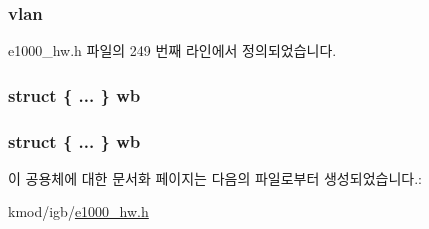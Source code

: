 \subsubsection[{\texorpdfstring{vlan}{vlan}}]{ vlan}\hypertarget{unione1000__rx__desc__extended_ae51e377f3b473a4541af0505e74399ae}{}\label{unione1000__rx__desc__extended_ae51e377f3b473a4541af0505e74399ae}


e1000\+\_\+hw.\+h 파일의 249 번째 라인에서 정의되었습니다.

\subsubsection[{\texorpdfstring{wb}{wb}}]{\setlength{\rightskip}{0pt plus 5cm}struct \{ ... \}   wb}\hypertarget{unione1000__rx__desc__extended_a18854ebc3616866f5bad02e274bd8818}{}\label{unione1000__rx__desc__extended_a18854ebc3616866f5bad02e274bd8818}
\subsubsection[{\texorpdfstring{wb}{wb}}]{\setlength{\rightskip}{0pt plus 5cm}struct \{ ... \}   wb}\hypertarget{unione1000__rx__desc__extended_af4c7cd19a677da5e7149240bc502f159}{}\label{unione1000__rx__desc__extended_af4c7cd19a677da5e7149240bc502f159}


이 공용체에 대한 문서화 페이지는 다음의 파일로부터 생성되었습니다.\+:\begin{DoxyCompactItemize}
\item 
kmod/igb/\hyperlink{kmod_2igb_2e1000__hw_8h}{e1000\+\_\+hw.\+h}\end{DoxyCompactItemize}
